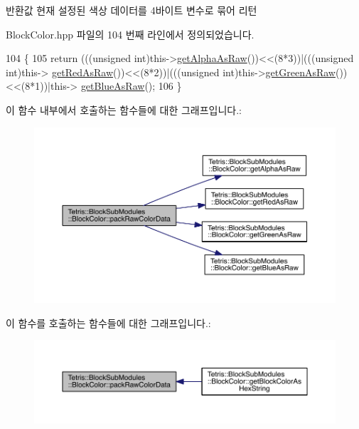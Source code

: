 \begin{DoxyReturn}{반환값}
현재 설정된 색상 데이터를 4바이트 변수로 묶어 리턴 
\end{DoxyReturn}


Block\+Color.\+hpp 파일의 104 번째 라인에서 정의되었습니다.


\begin{DoxyCode}
104                                            \{
105                 \textcolor{keywordflow}{return} (((\textcolor{keywordtype}{unsigned} \textcolor{keywordtype}{int})this->\hyperlink{class_tetris_1_1_block_sub_modules_1_1_block_color_acb1c9b34ee534857741025bd2824201a}{getAlphaAsRaw}())<<(8*3))|(((\textcolor{keywordtype}{unsigned} int)this->
      \hyperlink{class_tetris_1_1_block_sub_modules_1_1_block_color_a1795cf70c847d261645a9690afff7e9c}{getRedAsRaw}())<<(8*2))|(((\textcolor{keywordtype}{unsigned} \textcolor{keywordtype}{int})this->\hyperlink{class_tetris_1_1_block_sub_modules_1_1_block_color_a65e9230325a2f44aa433f39c199aabcd}{getGreenAsRaw}())<<(8*1))|this->
      \hyperlink{class_tetris_1_1_block_sub_modules_1_1_block_color_ac0ad44a8b001f3824447d137357f5145}{getBlueAsRaw}();
106             \}
\end{DoxyCode}
이 함수 내부에서 호출하는 함수들에 대한 그래프입니다.\+:
\nopagebreak
\begin{figure}[H]
\begin{center}
\leavevmode
\includegraphics[width=350pt]{de/d44/class_tetris_1_1_block_sub_modules_1_1_block_color_a849ebbb0e900c5efdcb99784767e7a7a_cgraph}
\end{center}
\end{figure}
이 함수를 호출하는 함수들에 대한 그래프입니다.\+:
\nopagebreak
\begin{figure}[H]
\begin{center}
\leavevmode
\includegraphics[width=350pt]{de/d44/class_tetris_1_1_block_sub_modules_1_1_block_color_a849ebbb0e900c5efdcb99784767e7a7a_icgraph}
\end{center}
\end{figure}
